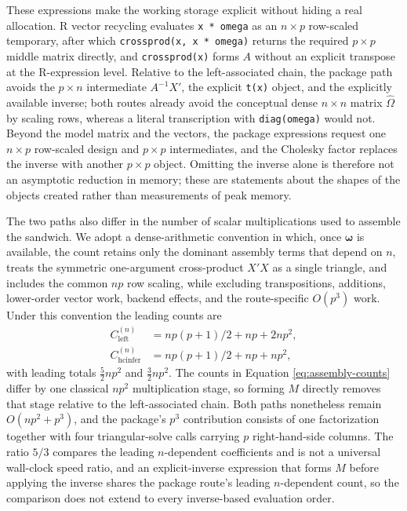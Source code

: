 These expressions make the working storage explicit without hiding a real allocation. R vector recycling evaluates \texttt{x\ *\ omega} as an \(n \times p\) row-scaled temporary, after which \texttt{crossprod(x,\ x\ *\ omega)} returns the required \(p \times p\) middle matrix directly, and \texttt{crossprod(x)} forms \(A\) without an explicit transpose at the R-expression level. Relative to the left-associated chain, the package path avoids the \(p \times n\) intermediate \(A^{-1}X'\), the explicit \texttt{t(x)} object, and the explicitly available inverse; both routes already avoid the conceptual dense \(n \times n\) matrix \(\widehat{\Omega}\) by scaling rows, whereas a literal transcription with \texttt{diag(omega)} would not. Beyond the model matrix and the vectors, the package expressions request one \(n \times p\) row-scaled design and \(p \times p\) intermediates, and the Cholesky factor replaces the inverse with another \(p \times p\) object. Omitting the inverse alone is therefore not an asymptotic reduction in memory; these are statements about the shapes of the objects created rather than measurements of peak memory.

The two paths also differ in the number of scalar multiplications used to assemble the sandwich. We adopt a dense-arithmetic convention in which, once \(\boldsymbol{\omega}\) is available, the count retains only the dominant assembly terms that depend on \(n\), treats the symmetric one-argument cross-product \(X'X\) as a single triangle, and includes the common \(np\) row scaling, while excluding transpositions, additions, lower-order vector work, backend effects, and the route-specific \(O(p^3)\) work. Under this convention the leading counts are
\begin{equation}
\begin{aligned}
C_{\mathrm{left}}^{(n)} &= np(p+1)/2 + np + 2np^2, \\
C_{\mathrm{hcinfer}}^{(n)} &= np(p+1)/2 + np + np^2,
\end{aligned}
\label{eq:assembly-counts}
\end{equation}
with leading totals \(\tfrac{5}{2}np^2\) and \(\tfrac{3}{2}np^2\). The counts in Equation \eqref{eq:assembly-counts} differ by one classical \(np^2\) multiplication stage, so forming \(M\) directly removes that stage relative to the left-associated chain. Both paths nonetheless remain \(O(np^2 + p^3)\), and the package's \(p^3\) contribution consists of one factorization together with four triangular-solve calls carrying \(p\) right-hand-side columns. The ratio \(5/3\) compares the leading \(n\)-dependent coefficients and is not a universal wall-clock speed ratio, and an explicit-inverse expression that forms \(M\) before applying the inverse shares the package route's leading \(n\)-dependent count, so the comparison does not extend to every inverse-based evaluation order.

